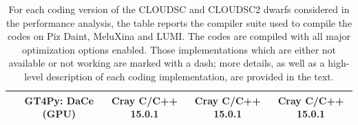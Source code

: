 \documentclass[gmd,manuscript,online]{copernicus}
\theoremstyle{theorem}
\theoremstyle{definition}
\theoremstyle{remark}
\theoremstyle{proposition}
\begin{document}
\begin{table}[t!]
\begin{footnotesize}
\begin{tabular}{|c|c|c|c|c|}
				& GT4Py: DaCe (GPU) & Cray C/C++ 15.0.1 & Cray C/C++ 15.0.1 & Cray C/C++ 15.0.1 \\
				\hline
			\end{tabular}
		\end{footnotesize}
		\vspace*{0.2cm}
		\caption{For each coding version of the CLOUDSC and CLOUDSC2 dwarfs considered in the performance analysis, the table reports the compiler suite used to compile the codes on Piz Daint, MeluXina and LUMI. The codes are compiled with all major optimization options enabled. Those implementations which are either not available or not working are marked with a dash; more details, as well as a high-level description of each coding implementation, are provided in the text.}
		\label{tab:compiler}
	\end{table}
\end{document}
